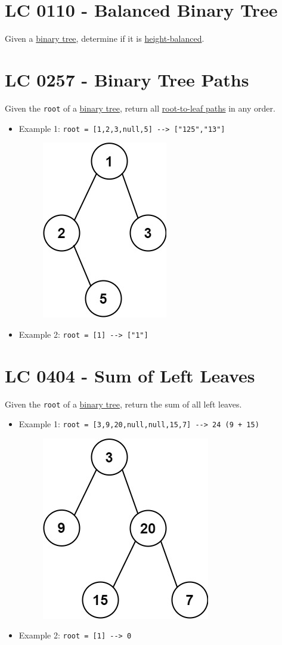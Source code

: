 \section{LC 0110 - Balanced Binary Tree}
Given a \ul{binary tree}, determine if it is \ul{height-balanced}.

\section{LC 0257 - Binary Tree Paths}
Given the {\colorbox{CodeBackground}{\lstinline|root|}} of a \ul{binary tree}, return all \ul{root-to-leaf paths} in any order.\\

\begin{itemize}
\item Example 1: {\colorbox{CodeBackground}{\lstinline|root = [1,2,3,null,5] --> ["125","13"]|}}
\begin{figure}[H]
\centering
\includegraphics[width=0.16\linewidth]{images/lc0257_eg}
\label{fig:lc0257eg}
\end{figure}
\item Example 2: {\colorbox{CodeBackground}{\lstinline|root = [1] --> ["1"]|}}
\end{itemize}

\section{LC 0404 - Sum of Left Leaves}
Given the {\colorbox{CodeBackground}{\lstinline|root|}} of a \ul{binary tree}, return the sum of all left leaves.\\

\begin{itemize}
\item Example 1: {\colorbox{CodeBackground}{\lstinline|root = [3,9,20,null,null,15,7] --> 24 (9 + 15)|}}
\begin{figure}[H]
\centering
\includegraphics[width=0.22\linewidth]{images/lc0404_eg}
\label{fig:lc0404eg}
\end{figure}
\item Example 2: {\colorbox{CodeBackground}{\lstinline|root = [1] --> 0|}}
\end{itemize}

